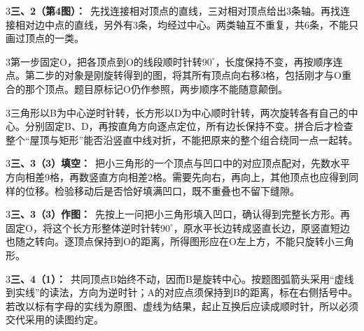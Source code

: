 \documentclass[multi=snippet,border={5bp 20bp 5bp 5bp}]{standalone}
\newenvironment{snippet}[3]{\begin{minipage}{#1bp}\color{answerred}\fontsize{#2}{#3}\selectfont\raggedright}{\end{minipage}}
\begin{document}
\begin{snippet}{505}{11.5}{14}\begin{multicols}{3}\raggedcolumns \textbf{三、2（第4图）：}\ 先找连接相对顶点的直线，三对相对顶点给出3条轴。再找连接相对边中点的直线，另外有3条，均经过中心。两类轴互不重复，共6条，不能只画过顶点的一类。\end{multicols}\end{snippet}
\begin{snippet}{505}{11.5}{14}\begin{multicols}{3}\raggedcolumns 第一步固定O，把各顶点到O的线段顺时针转\(90^\circ\)\allowbreak ，长度保持不变，再按顺序连点。第二步的对象是刚旋转得到的图，将其所有顶点向右移3格，包括刚才与O重合的那个顶点。题目原标记O仍作参照，两步顺序不能随意颠倒。\end{multicols}\end{snippet}
\begin{snippet}{505}{11.5}{14}\begin{multicols}{3}\raggedcolumns 三角形以B为中心逆时针转，长方形以D为中心顺时针转，两次旋转各有自己的中心。分别固定B、D，再按直角方向逐点定位，所有边长保持不变。拼合后才检查整个“屋顶与矩形”能否沿竖直中线对折，不能把原来的整个组合绕同一点一起转。\end{multicols}\end{snippet}
\begin{snippet}{505}{11.5}{14}\begin{multicols}{3}\raggedcolumns \textbf{三、3（3）填空：}\ 把小三角形的一个顶点与凹口中的对应顶点配对，先数水平方向相差9格，再数竖直方向相差2格。需要先向右，再向上，其他顶点也应得到同样的位移。检验移动后是否恰好填满凹口，既不重叠也不留下缝隙。\end{multicols}\end{snippet}
\begin{snippet}{505}{11.5}{14}\begin{multicols}{3}\raggedcolumns \textbf{三、3（3）作图：}\ 先按上一问把小三角形填入凹口，确认得到完整长方形。再固定O，将这个长方形整体逆时针转\(90^\circ\)\allowbreak ，原水平长边转成竖直长边，原竖直短边也随之转向。逐顶点保持到O的距离，所得图形应在O左上方，不能只旋转小三角形。\end{multicols}\end{snippet}
\begin{snippet}{505}{11.5}{14}\begin{multicols}{3}\raggedcolumns \textbf{三、4（1）：}\ 共同顶点B始终不动，因而B是旋转中心。按题图弧箭头采用“虚线到实线”的读法，方向为逆时针；A的对应点须保持到B的距离，标在右侧括号中。若改以标有字母的实线为原图、虚线为结果，起止互换后应读成顺时针，所以必须交代采用的读图约定。\end{multicols}\end{snippet}
\end{document}
